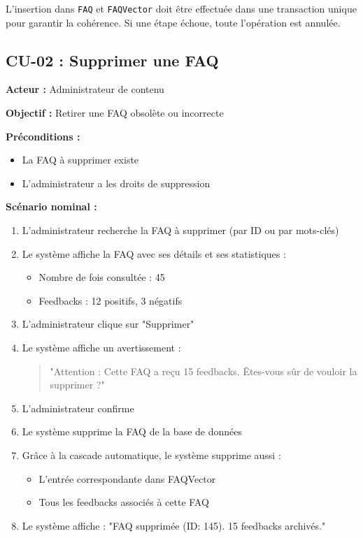 \documentclass[11pt,a4paper]{article}
\begin{document}
\begin{important}[Atomicité]
L'insertion dans \texttt{FAQ} et \texttt{FAQVector} doit être effectuée dans une transaction unique pour garantir la cohérence. Si une étape échoue, toute l'opération est annulée.
\end{important}

\clearpage

\subsection{CU-02 : Supprimer une FAQ}

\textbf{Acteur :} Administrateur de contenu

\textbf{Objectif :} Retirer une FAQ obsolète ou incorrecte

\textbf{Préconditions :}
\begin{itemize}
    \item La FAQ à supprimer existe
    \item L'administrateur a les droits de suppression
\end{itemize}

\textbf{Scénario nominal :}

\begin{enumerate}
    \item L'administrateur recherche la FAQ à supprimer (par ID ou par mots-clés)
    \item Le système affiche la FAQ avec ses détails et ses statistiques :
    \begin{itemize}
        \item Nombre de fois consultée : 45
        \item Feedbacks : 12 positifs, 3 négatifs
    \end{itemize}
    \item L'administrateur clique sur "Supprimer"
    \item Le système affiche un avertissement :
    \begin{quote}
    "Attention : Cette FAQ a reçu 15 feedbacks. Êtes-vous sûr de vouloir la supprimer ?"
    \end{quote}
    \item L'administrateur confirme
    \item Le système supprime la FAQ de la base de données
    \item Grâce à la cascade automatique, le système supprime aussi :
    \begin{itemize}
        \item L'entrée correspondante dans FAQVector
        \item Tous les feedbacks associés à cette FAQ
    \end{itemize}
    \item Le système affiche : "FAQ supprimée (ID: 145). 15 feedbacks archivés."
\end{enumerate}
\end{document}
